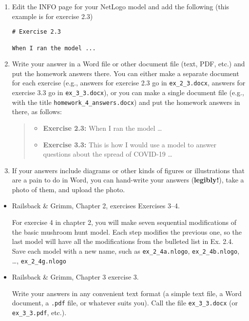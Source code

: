 \documentclass[
]{article}
\providecommand{\tightlist}{%
  \setlength{\itemsep}{0pt}\setlength{\parskip}{0pt}}
\begin{document}
\begin{enumerate}
\def\labelenumi{\arabic{enumi}.}
\item
  Edit the INFO page for your NetLogo model and add the following (this
  example is for exercise 2.3)

\begin{verbatim}
# Exercise 2.3

When I ran the model ...
\end{verbatim}
\item
  Write your answer in a Word file or other document file (text, PDF,
  etc.) and put the homework answers there. You can either make a
  separate document for each exercise (e.g., answers for exercise 2.3 go
  in \texttt{ex\_2\_3.docx}, answers for exercise 3.3 go in
  \texttt{ex\_3\_3.docx}), or you can make a single document file (e.g.,
  with the title \texttt{homework\_4\_answers.docx}) and put the
  homework answers in there, as follows:

  \begin{quote}
  \begin{itemize}
  \tightlist
  \item
    \textbf{Exercise 2.3:} When I ran the model \ldots{}
  \item
    \textbf{Exercise 3.3:} This is how I would use a model to answer
    questions about the spread of COVID-19 \ldots{}
  \end{itemize}
  \end{quote}
\item
  If your answers include diagrams or other kinds of figures or
  illustrations that are a pain to do in Word, you can hand-write your
  answers (\textbf{legibly!}), take a photo of them, and upload the
  photo.
\end{enumerate}

\begin{itemize}
\item
  Railsback \& Grimm, Chapter 2, exercises Exercises 3--4.

  For exercise 4 in chapter 2, you will make seven sequential
  modifications of the basic mushroom hunt model. Each step modifies the
  previous one, so the last model will have all the modifications from
  the bulleted list in Ex. 2.4. Save each model with a new name, such as
  \texttt{ex\_2\_4a.nlogo}, \texttt{ex\_2\_4b.nlogo}, \dots,
  \texttt{ex\_2\_4g.nlogo}
\item
  Railsback \& Grimm, Chapter 3 exercise 3.

  Write your answers in any convenient text format (a simple text file,
  a Word document, a \texttt{.pdf} file, or whatever suits you). Call
  the file \texttt{ex\_3\_3.docx} (or \texttt{ex\_3\_3.pdf}, etc.).
\end{itemize}
\end{document}
